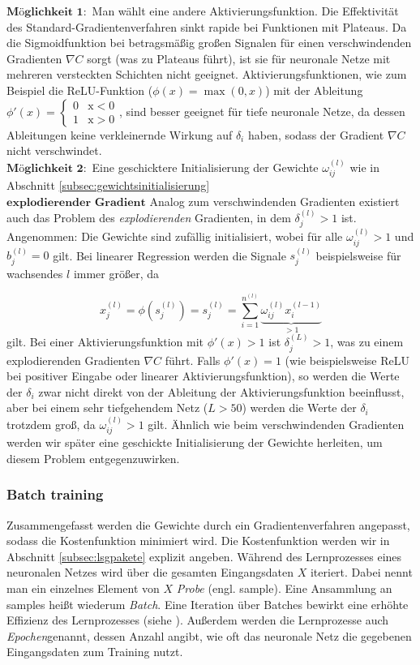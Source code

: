 $\textbf{Möglichkeit 1}:$ Man wählt eine andere Aktivierungsfunktion. Die Effektivität des Standard-Gradientenverfahren
sinkt rapide bei Funktionen mit Plateaus. Da die Sigmoidfunktion bei betragsmäßig großen Signalen für einen
verschwindenden Gradienten $\nabla C$ sorgt (was zu Plateaus führt), ist sie für neuronale Netze mit mehreren versteckten
Schichten nicht geeignet. Aktivierungsfunktionen, wie zum Beispiel die ReLU-Funktion ($\phi(x)=\max(0,x)$) mit der
Ableitung $\phi'(x)= \begin {cases} 0 &\text{x}<0\\ 1 &\text{x}>0\end{cases}$, sind besser geeignet für tiefe neuronale
Netze, da dessen Ableitungen keine verkleinernde Wirkung auf $\delta_i$ haben, sodass der Gradient $\nabla C$ nicht
verschwindet.\\
$\textbf{Möglichkeit 2}:$ Eine geschicktere Initialisierung der Gewichte $\omega_{ij}^{(l)}$ wie in Abschnitt
\eqref{subsec:gewichtsinitialisierung}\\
$\textbf{explodierender Gradient}$
Analog zum verschwindenden Gradienten existiert auch das Problem des \textit{explodierenden} Gradienten, in dem
$\delta_j^{(l)}>1$ ist.\\
Angenommen: Die Gewichte sind zufällig initialisiert, wobei für alle $\omega_{ij}^{(l)}>1$ und $b_j^{(l)}=0$
gilt. Bei linearer Regression werden die Signale $s_j^{(l)}$  beispielsweise für wachsendes $l$ immer größer, da

\[
    x_j^{(l)}=\phi(s_j^{(l)})=s_j^{(l)}=\sum\limits_{i=1}^{n^{(l)}} \underbrace{\omega_{ij}^{(l)}x_{i}^{(l-1)}}_{>1}
\]
gilt. Bei einer Aktivierungsfunktion mit $\phi'(x)>1$ ist $\delta_j^{(L)}>1$, was zu einem explodierenden Gradienten $\nabla C$
führt. Falls $\phi'(x)=1$ (wie beispielsweise ReLU bei positiver Eingabe oder linearer Aktivierungsfunktion), so werden
die Werte der $\delta_i$ zwar nicht direkt von der Ableitung der Aktivierungsfunktion beeinflusst, aber bei einem sehr
tiefgehendem Netz ($L>50$) werden die Werte der $\delta_i$ trotzdem groß, da $\omega_{ij}^{(l)}>1$ gilt. Ähnlich wie beim
verschwindenden Gradienten werden wir später eine geschickte Initialisierung der Gewichte herleiten, um diesem Problem
entgegenzuwirken.

\subsubsection{Batch training}
Zusammengefasst werden die Gewichte durch ein Gradientenverfahren angepasst, sodass die Kostenfunktion minimiert wird.
Die Kostenfunktion werden wir in Abschnitt \eqref{subsec:lsgpakete} explizit angeben. Während des Lernprozesses eines
neuronalen Netzes wird über die gesamten Eingangsdaten $X$ iteriert. Dabei nennt man ein einzelnes Element von $X$
\textit{Probe} (engl. sample). Eine Ansammlung an samples heißt wiederum \textit{Batch}. Eine Iteration über Batches
bewirkt eine erhöhte Effizienz des Lernprozesses (siehe \cite[6.2.8]{ovidiucalinDeepLearningArchitectures}). Außerdem
werden die Lernprozesse auch \textit{Epochen}genannt, dessen Anzahl angibt, wie oft das neuronale Netz die gegebenen
Eingangsdaten zum Training nutzt.

